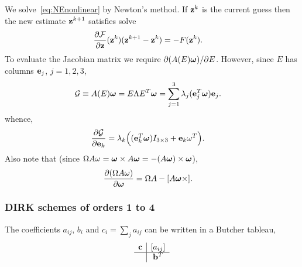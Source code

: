 % 
We solve~\eqref{eq:NEnonlinear} by Newton's method. If $\mathbf{ z}^k$ is the current guess then the
new estimate $\mathbf{ z}^{k+1}$ satisfies
solve
\begin{align}
  \frac{\partial \mathcal{F}}{\partial \mathbf{ z}}(\mathbf{ z}^k) (\mathbf{ z}^{k+1}-\mathbf{ z}^k) &= - F(\mathbf{ z}^k).
\end{align}
To evaluate the Jacobian matrix we require $\partial (A(E) \boldsymbol{\omega})/\partial E$. 
However, since $E$ has columns $\mathbf{ e}_j$, $j=1,2,3$, 
\begin{align}
   \mathcal{G} &\equiv  A(E) \boldsymbol{\omega} = E \Lambda E^T \boldsymbol{\omega} = \sum_{j=1}^3 \lambda_j (\mathbf{ e}_j^T\boldsymbol{\omega}) \mathbf{ e}_j . 
\end{align}
whence, 
\begin{align}
   \frac{\partial \mathcal{G}}{\partial \mathbf{ e}_k}  &=  \lambda_k\Big(  (\mathbf{ e}_k^T\boldsymbol{\omega}) I_{3\times3} + \mathbf{ e}_k\omega^T \Big). 
\end{align}
Also note that (since $\Omega A \omega = \boldsymbol{\omega}\times A \boldsymbol{\omega} = - (A\boldsymbol{\omega})\times\boldsymbol{\omega}$), 
\begin{align}
   \frac{\partial (\Omega A \omega)}{\partial \boldsymbol{\omega}}  &=  \Omega A - [ A\boldsymbol{\omega}\times].
\end{align}


\subsubsection{DIRK schemes of orders 1 to 4}

The coefficients $a_{ij}$, $b_i$ and $c_i=\sum_j a_{ij}$ can be written in a Butcher tableau, 
\renewcommand{\arraystretch}{1.5}
\begin{align}
 \begin{array}{c|c}
  {\mathbf c} & [a_{ij}] \\
  \hline
     & \mathbf{ b}^T
 \end{array}
\end{align}

